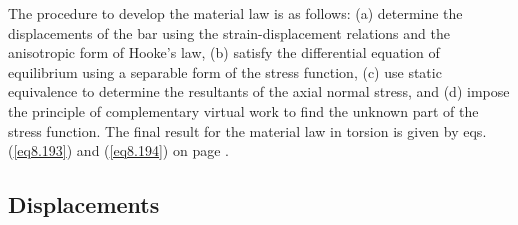 \documentclass{AeroStructure-ERJohnson}
\begin{document}
The procedure to develop the material law is as
follows: (a) determine the displacements of the bar using the
strain-displacement relations and the anisotropic form of Hooke's
law, (b) satisfy the differential equation of equilibrium using a
separable form of the stress function, (c) use static equivalence
to determine the resultants of the axial normal stress, and (d)
impose the principle of complementary virtual work to find the
unknown part of the stress function. The final result for the
material law in torsion is given by eqs. (\ref{eq8.193}) and
(\ref{eq8.194}) on page \pageref{eq8.194}.


\subsection{Displacements}\label{sec8.4.1}
\end{document}
